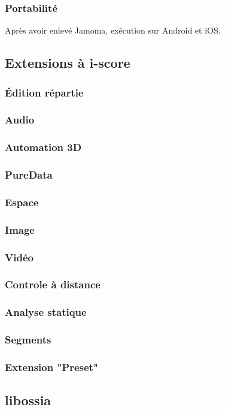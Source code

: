 \documentclass[french,a4paper]{book}
\begin{document}
\subsubsection{Portabilité}
Après avoir enlevé Jamoma, exécution sur Android et iOS.
    
\subsection{Extensions à i-score}
\subsubsection{Édition répartie}
\subsubsection{Audio}
\subsubsection{Automation 3D}
\subsubsection{PureData}
\subsubsection{Espace}
\subsubsection{Image}
\subsubsection{Vidéo}
\subsubsection{Controle à distance}
\subsubsection{Analyse statique}
\subsubsection{Segments}
\subsubsection{Extension "Preset"}

\subsection{libossia}
\end{document}
